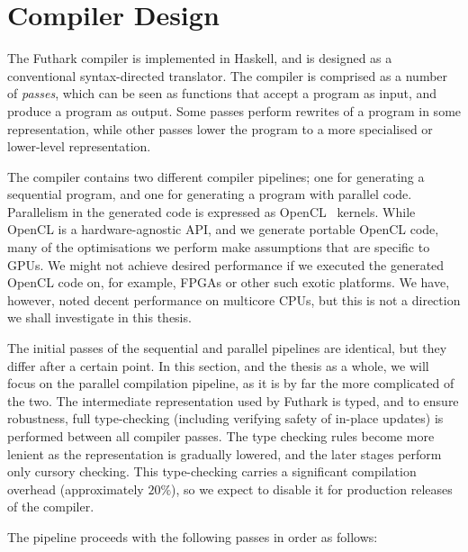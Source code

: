 \section{Compiler Design}
\label{sec:compiler-design}

The Futhark compiler is implemented in Haskell, and is designed as a
conventional syntax-directed translator.  The compiler is comprised as
a number of \textit{passes}, which can be seen as functions that
accept a program as input, and produce a program as output.  Some
passes perform rewrites of a program in some representation, while
other passes lower the program to a more specialised or lower-level
representation.

The compiler contains two different compiler pipelines; one for
generating a sequential program, and one for generating a program with
parallel code.  Parallelism in the generated code is expressed as
OpenCL~\cite{Stone:2010:OPP:622179.1803953} kernels.  While OpenCL is
a hardware-agnostic API, and we generate portable OpenCL code, many of
the optimisations we perform make assumptions that are specific to
GPUs.  We might not achieve desired performance if we executed the
generated OpenCL code on, for example, FPGAs or other such exotic
platforms.  We have, however, noted decent performance on multicore
CPUs, but this is not a direction we shall investigate in this thesis.

The initial passes of the sequential and parallel pipelines are
identical, but they differ after a certain point.  In this section,
and the thesis as a whole, we will focus on the parallel compilation
pipeline, as it is by far the more complicated of the two.  The
intermediate representation used by Futhark is typed, and to ensure
robustness, full type-checking (including verifying safety of in-place
updates) is performed between all compiler passes.  The type checking
rules become more lenient as the representation is gradually lowered,
and the later stages perform only cursory checking.  This
type-checking carries a significant compilation overhead
(approximately $20\%$), so we expect to disable it for production
releases of the compiler.

The pipeline proceeds with the following passes in order as follows:

